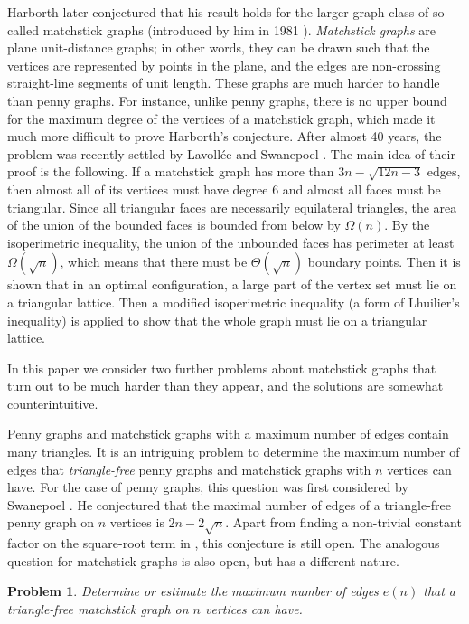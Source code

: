 \documentclass[12pt]{article}
\theoremstyle{plain}
\newtheorem{problem}{Problem}
\theoremstyle{definition}
\theoremstyle{remark}
\begin{document}
Harborth later conjectured \cite{Harborth2} that his result holds for the larger graph class of so-called matchstick graphs (introduced by him in 1981 \cite{Harborth1}). \emph{Matchstick graphs} are plane unit-distance graphs; in other words, they can be drawn such that the vertices are represented by points in the plane, and the edges are non-crossing straight-line segments of unit length.
These graphs are much harder to handle than penny graphs.
For instance, unlike penny graphs, there is no upper bound for the maximum degree of the vertices of a matchstick graph, which made it much more difficult to prove Harborth's conjecture. After almost 40 years, the problem was recently settled by Lavoll\'ee and Swanepoel \cite{LS22}. The main idea of their proof is the following. If a matchstick graph has more than $3n-\sqrt{12n-3}$ edges, then almost all of its vertices must have degree $6$ and almost all faces must be triangular. Since all triangular faces are necessarily equilateral triangles, the area of the union of the bounded faces is bounded from below by $\Omega(n)$. By the isoperimetric inequality, the union of the unbounded faces has perimeter at least $\Omega(\sqrt{n})$, which means that there must be $\Theta(\sqrt{n})$ boundary points. Then it is shown that in an optimal configuration, a large part of the vertex set must lie on a triangular lattice. Then a modified isoperimetric inequality (a form of Lhuilier's inequality) is applied to show that the whole graph must lie on a triangular lattice. 

In this paper we consider two further problems about matchstick graphs that turn out to be much harder than they appear, and the solutions are somewhat counterintuitive.

Penny graphs and matchstick graphs with a maximum number of edges contain many triangles. It is an intriguing problem to determine the maximum number of edges that \emph{triangle-free} penny graphs and matchstick graphs with $n$ vertices can have. For the case of penny graphs, this question was first considered by Swanepoel \cite{S09}. He conjectured that the maximal number of edges of a triangle-free penny graph on $n$ vertices is $2n - 2 \sqrt n$. Apart from finding a non-trivial constant factor on the square-root term in \cite{E17}, this conjecture is still open.
The analogous question for matchstick graphs is also open, but has a different nature.

\begin{problem} \label{problem_trianglefree}
Determine or estimate the maximum number of edges $e(n)$ that a triangle-free matchstick graph on $n$ vertices can have.
\end{problem}
\end{document}
